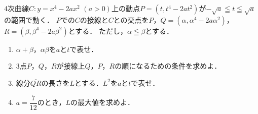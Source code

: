 \documentclass[../../main.tex]{subfiles}
\begin{document}
4次曲線$C:y=x^4-2ax^2$ $(a>0)$上の動点$P=(t,t^4-2at^2)$が$-\sqrt{a} \leqq t \leqq \sqrt{a}$の範囲で動く．
$P$での$C$の接線と$C$との交点を$P$，$Q=(\alpha,\alpha^4-2a\alpha^2)$，$R=(\beta,\beta^4-2a\beta^2)$とする．
ただし，$\alpha \leqq \beta$とする．
\begin{enumerate}
  \item $\alpha+\beta$，$\alpha\beta$を$a$と$t$で表せ．
  \item 3点$P$，$Q$，$R$が接線上$Q$，$P$，$R$の順になるための条件を求めよ．
  \item 線分$\overline{QR}$の長さを$L$とする．$L^2$を$a$と$t$で表せ．
  \item $\displaystyle a=\dfrac{7}{12}$のとき，$L$の最大値を求めよ．
\end{enumerate}
\end{document}
